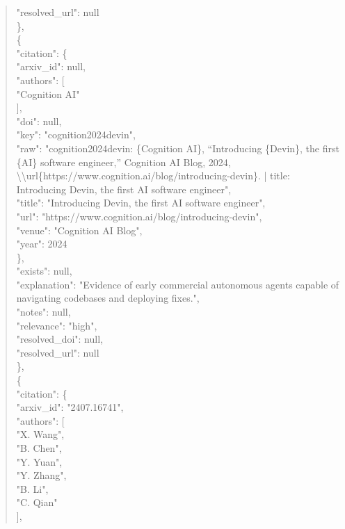 \documentclass[11pt]{article}
\begin{document}
\begin{quote}
      "resolved\_url": null\\
    \},\\
    \{\\
      "citation": \{\\
        "arxiv\_id": null,\\
        "authors": [\\
          "Cognition AI"\\
        ],\\
        "doi": null,\\
        "key": "cognition2024devin",\\
        "raw": "cognition2024devin: \{Cognition AI\}, ``Introducing \{Devin\}, the first \{AI\} software engineer,'' Cognition AI Blog, 2024, \textbackslash{}\textbackslash{}url\{https://www.cognition.ai/blog/introducing-devin\}. | title: Introducing Devin, the first AI software engineer",\\
        "title": "Introducing Devin, the first AI software engineer",\\
        "url": "https://www.cognition.ai/blog/introducing-devin",\\
        "venue": "Cognition AI Blog",\\
        "year": 2024\\
      \},\\
      "exists": null,\\
      "explanation": "Evidence of early commercial autonomous agents capable of navigating codebases and deploying fixes.",\\
      "notes": null,\\
      "relevance": "high",\\
      "resolved\_doi": null,\\
      "resolved\_url": null\\
    \},\\
    \{\\
      "citation": \{\\
        "arxiv\_id": "2407.16741",\\
        "authors": [\\
          "X. Wang",\\
          "B. Chen",\\
          "Y. Yuan",\\
          "Y. Zhang",\\
          "B. Li",\\
          "C. Qian"\\
        ],\\

\end{quote}
\end{document}
